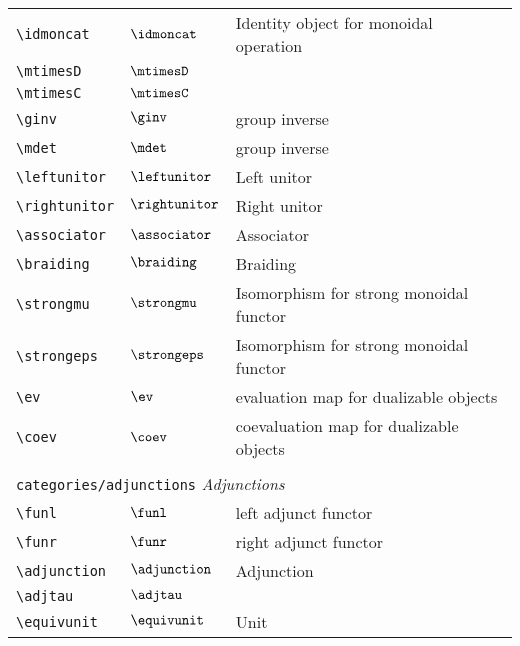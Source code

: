 \begin{longtable}{lll}
 {\color[rgb]{0.5,0.5,0.5}\texttt{\textbackslash idmoncat}} & $\idmoncat$ &  Identity object for monoidal operation\\ 
 {\color[rgb]{0.5,0.5,0.5}\texttt{\textbackslash mtimesD}} & $\mtimesD$ & \\ 
 {\color[rgb]{0.5,0.5,0.5}\texttt{\textbackslash mtimesC}} & $\mtimesC$ & \\ 
 {\color[rgb]{0.5,0.5,0.5}\texttt{\textbackslash ginv}} & $\ginv$ &  group inverse\\ 
 {\color[rgb]{0.5,0.5,0.5}\texttt{\textbackslash mdet}} & $\mdet$ &  group inverse\\ 
 {\color[rgb]{0.5,0.5,0.5}\texttt{\textbackslash leftunitor}} & $\leftunitor$ &  Left unitor\\ 
 {\color[rgb]{0.5,0.5,0.5}\texttt{\textbackslash rightunitor}} & $\rightunitor$ &  Right unitor\\ 
 {\color[rgb]{0.5,0.5,0.5}\texttt{\textbackslash associator}} & $\associator$ &  Associator\\ 
 {\color[rgb]{0.5,0.5,0.5}\texttt{\textbackslash braiding}} & $\braiding$ &  Braiding\\ 
 {\color[rgb]{0.5,0.5,0.5}\texttt{\textbackslash strongmu}} & $\strongmu$ &  Isomorphism for strong monoidal functor\\ 
 {\color[rgb]{0.5,0.5,0.5}\texttt{\textbackslash strongeps}} & $\strongeps$ &  Isomorphism for strong monoidal functor\\ 
 {\color[rgb]{0.5,0.5,0.5}\texttt{\textbackslash ev}} & $\ev$ &  evaluation map for dualizable objects\\ 
 {\color[rgb]{0.5,0.5,0.5}\texttt{\textbackslash coev}} & $\coev$ &  coevaluation map for dualizable objects\\ 
  &  & \\ 
 \multicolumn{3}{l}{{\color[rgb]{0.5,0.5,0.5}\texttt{categories/adjunctions}} \emph{Adjunctions}}\\ 
 \hline
{\color[rgb]{0.5,0.5,0.5}\texttt{\textbackslash funl}} & $\funl$ &  left adjunct functor\\ 
 {\color[rgb]{0.5,0.5,0.5}\texttt{\textbackslash funr}} & $\funr$ &  right adjunct functor\\ 
 {\color[rgb]{0.5,0.5,0.5}\texttt{\textbackslash adjunction}} & $\adjunction$ &  Adjunction\\ 
 {\color[rgb]{0.5,0.5,0.5}\texttt{\textbackslash adjtau}} & $\adjtau$ & \\ 
 {\color[rgb]{0.5,0.5,0.5}\texttt{\textbackslash equivunit}} & $\equivunit$ &  Unit\\ 

\end{longtable}
